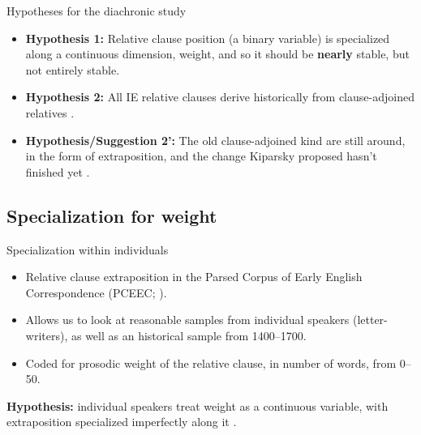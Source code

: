 \documentclass[hyperref={pdfpagelabels=false}]{beamer}
\begin{document}
\begin{frame}{Hypotheses for the diachronic study}
\begin{itemize}
    \item \textbf{Hypothesis 1:} Relative clause position (a binary variable) is specialized along a continuous dimension, weight, and so it should be \textbf{nearly} stable, but not entirely stable.
    \item \textbf{Hypothesis 2:} All IE relative clauses derive historically from clause-adjoined relatives \small{\citep{kiparsky1995}}.
        \item \textbf{Hypothesis/Suggestion 2':} The old clause-adjoined kind are still around, in the form of extraposition, and the change Kiparsky proposed hasn't finished yet \small{\citep{wallenbergunderrev}}.
    \end{itemize}

\end{frame}



\subsection{Specialization for weight}

\begin{frame}{Specialization within individuals}
\begin{itemize}
	\item Relative clause extraposition in the Parsed Corpus of Early English Correspondence  (PCEEC; \citealt{pceec}).
	\item Allows us to look at reasonable samples from individual speakers (letter-writers), as well as an historical sample from 1400--1700.
	\item Coded for prosodic weight of the relative clause, in number of words, from 0--50.
\end{itemize}
	\textbf{Hypothesis:} individual speakers treat weight as a continuous variable, with extraposition specialized imperfectly along it \citep[as suggested by][]{antonmackenzie2011a}.

\end{frame}
\end{document}
